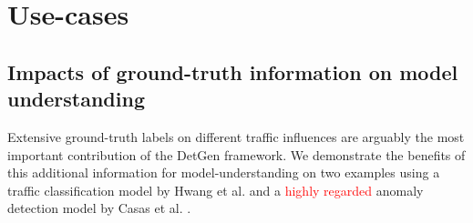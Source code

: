 \documentclass[sigconf]{acmart}
\begin{document}
%
%
%



\section{Use-cases}

\subsection{Impacts of ground-truth information on model understanding}

Extensive ground-truth labels on different traffic influences are arguably the most important contribution of the DetGen framework. We demonstrate the benefits of this additional information for model-understanding on two examples using a traffic classification model by Hwang et al. \cite{hwang2019lstm} and a \textcolor{red}{highly regarded} anomaly detection model by Casas et al. \cite{casas2012unsupervised}.
\end{document}
